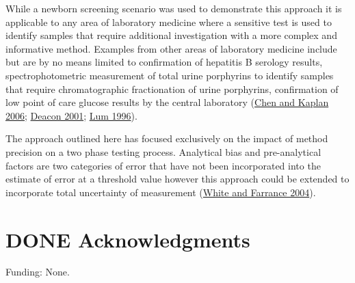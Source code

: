 \documentclass[review]{elsarticle}
\begin{document}
While a newborn screening scenario was used to demonstrate this
approach it is applicable to any area of laboratory medicine where a
sensitive test is used to identify samples that require additional
investigation with a more complex and informative method. Examples
from other areas of laboratory medicine include but are by no means
limited to confirmation of hepatitis B serology results,
spectrophotometric measurement of total urine porphyrins to identify
samples that require chromatographic fractionation of urine
porphyrins, confirmation of low point of care glucose results by the
central laboratory (\hyperlink{citeproc_bib_item_2}{Chen and Kaplan 2006}; \hyperlink{citeproc_bib_item_4}{Deacon 2001}; \hyperlink{citeproc_bib_item_6}{Lum 1996}).

The approach outlined here has focused exclusively on the impact of
method precision on a two phase testing process. Analytical bias and
pre-analytical factors are two categories of error that have not been
incorporated into the estimate of error at a threshold value however
this approach could be extended to incorporate total uncertainty of
measurement (\hyperlink{citeproc_bib_item_11}{White and Farrance 2004}).

\section*{{\bfseries\sffamily DONE} Acknowledgments}
\label{sec:org92daaa3}
Funding: None.
\end{document}
